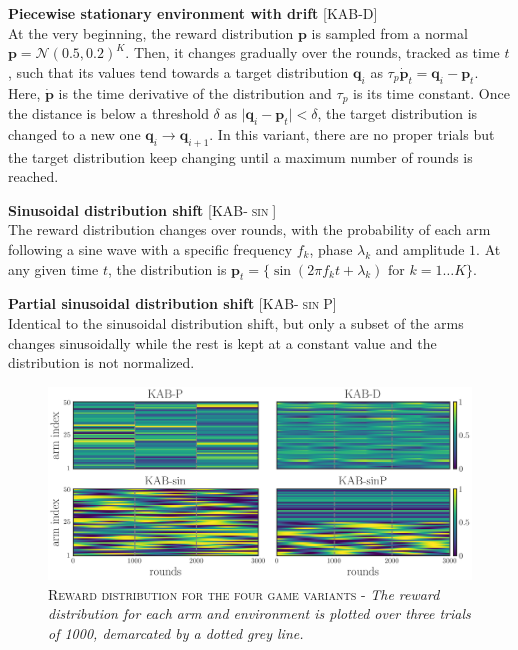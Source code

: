 \hfill \break
\noindent \textbf{Piecewise stationary environment with drift} [\textsc{KAB-D}]\\ At the very beginning, the reward distribution $\mathbf{p}$ is sampled from a normal $\mathbf{p}=\mathcal{N}(0.5, 0.2)^{K}$.
Then, it changes gradually over the rounds, tracked as time $t$, such that its values tend towards a target distribution $\mathbf{q}_{i}$ as $\tau_{p}\dot{\mathbf{p}}_{t}=\mathbf{q}_{i}-\mathbf{p}_{t}$.
Here, $\dot{\mathbf{p}}$ is the time derivative of the distribution and $\tau_{p}$ is its time constant.
Once the distance is below a threshold $\delta$ as $\vert \mathbf{q}_{i} - \mathbf{p}_{t}\vert < \delta$, the target distribution is changed to a new one $\mathbf{q}_{i}\to\mathbf{q}_{i+1}$. In this variant, there are no proper trials but the target distribution keep changing until a maximum number
of rounds is reached.

\hfill \break
\noindent \textbf{Sinusoidal distribution shift} [\textsc{KAB-$\sin$}]\\ The reward distribution changes over rounds, with the probability of each arm following a sine wave with a specific frequency $f_{k}$, phase $\lambda_{k}$ and amplitude $1$. At any given time $t$, the distribution is $\mathbf{p}_{t}=\{\sin(2\pi f_{k} t+\lambda_{k})\text{  for }k=1\ldots K\}$.

\hfill \break
\noindent \textbf{Partial sinusoidal distribution shift} [\textsc{KAB-$\sin$P}]\\ Identical to the sinusoidal distribution shift, but only a subset of the arms changes sinusoidally while the rest is kept at a constant value and the distribution is not normalized.


\begin{figure}[ht]
    \centering
    \includegraphics[width=1.\textwidth]{figures/envs_1.png}
    \caption{\textsc{Reward distribution for the four game variants} - \textit{The reward distribution for each arm and environment is plotted over three trials of 1000, demarcated by a dotted grey line.}}
    \label{fig:envs}
\end{figure}


